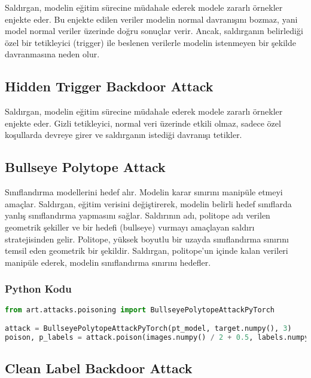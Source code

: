 Saldırgan, modelin eğitim sürecine müdahale ederek modele zararlı örnekler enjekte eder. Bu enjekte edilen veriler modelin normal davranışını bozmaz, yani model normal veriler üzerinde doğru sonuçlar verir. Ancak, saldırganın belirlediği özel bir tetikleyici (trigger) ile beslenen verilerle modelin istenmeyen bir şekilde davranmasına neden olur.

\newpage

\subsection{Hidden Trigger Backdoor Attack}

Saldırgan, modelin eğitim sürecine müdahale ederek modele zararlı örnekler enjekte eder. Gizli tetikleyici, normal veri üzerinde etkili olmaz, sadece özel koşullarda devreye girer ve saldırganın istediği davranışı tetikler.

\newpage

\subsection{Bullseye Polytope Attack}

Sınıflandırma modellerini hedef alır. Modelin karar sınırını manipüle etmeyi amaçlar. Saldırgan, eğitim verisini değiştirerek, modelin belirli hedef sınıflarda yanlış sınıflandırma yapmasını sağlar. Saldırının adı, politope adı verilen geometrik şekiller ve bir hedefi (bullseye) vurmayı amaçlayan saldırı stratejisinden gelir. Politope, yüksek boyutlu bir uzayda sınıflandırma sınırını temsil eden geometrik bir şekildir. Saldırgan, politope'un içinde kalan verileri manipüle ederek, modelin sınıflandırma sınırını hedefler.

\subsubsection{Python Kodu}

\begin{lstlisting}[language=Python]
from art.attacks.poisoning import BullseyePolytopeAttackPyTorch

attack = BullseyePolytopeAttackPyTorch(pt_model, target.numpy(), 3)
poison, p_labels = attack.poison(images.numpy() / 2 + 0.5, labels.numpy())
\end{lstlisting}

\newpage

\subsection{Clean Label Backdoor Attack}

